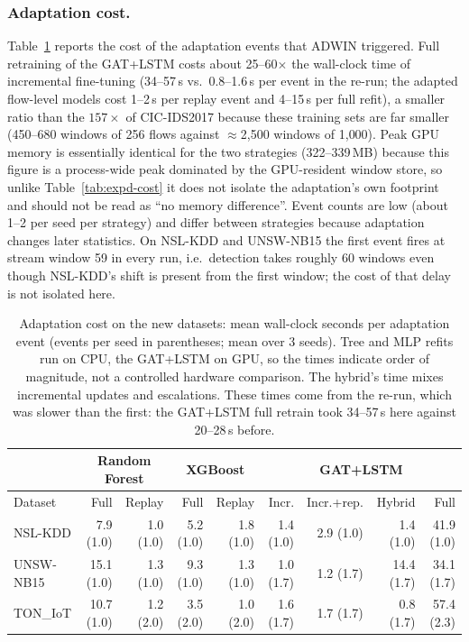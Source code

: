 \documentclass[twocolumn]{llncs}
\begin{document}
\subsubsection{Adaptation cost.} Table~\ref{tab:multi-cost} reports the cost of the adaptation events
that ADWIN triggered. Full retraining of the GAT+LSTM costs about 25--60$\times$ the wall-clock time of incremental
fine-tuning (34--57\,s vs.\ 0.8--1.6\,s per event in the re-run; the adapted flow-level
models cost 1--2\,s per replay event and 4--15\,s per full refit), a smaller ratio than the $157\times$ of
CIC-IDS2017 because these training sets are far smaller (450--680 windows of 256 flows against
$\approx$2{,}500 windows of 1{,}000). Peak GPU memory is essentially identical for the two strategies
(322--339\,MB) because this figure is a process-wide peak dominated by the GPU-resident window store,
so unlike Table~\ref{tab:expd-cost} it does not isolate the adaptation's own footprint and should
not be read as ``no memory difference''. Event counts are low (about 1--2 per seed per strategy) and
differ between strategies because adaptation changes later statistics. On NSL-KDD and UNSW-NB15 the
first event fires at stream window 59 in every run, i.e.\ detection takes roughly 60 windows even
though NSL-KDD's shift is present from the first window; the cost of that delay is not isolated here.

\begin{table}[!t]
\centering
\caption{Adaptation cost on the new datasets: mean wall-clock seconds per adaptation event (events
per seed in parentheses; mean over 3 seeds). Tree and MLP refits run on CPU, the GAT+LSTM on GPU, so
the times indicate order of magnitude, not a controlled hardware comparison. The hybrid's time mixes
incremental updates and escalations. These times come from the re-run, which was slower than the
first: the GAT+LSTM full retrain took 34--57\,s here against 20--28\,s before.}
\label{tab:multi-cost}
\small
\setlength{\tabcolsep}{3pt}
\begin{tabular}{|l|r|r|r|r|r|r|r|r|}
\hline
 & \multicolumn{2}{|c|}{Random Forest} & \multicolumn{2}{|c|}{XGBoost} & \multicolumn{4}{|c|}{GAT+LSTM} \\
\hline
Dataset & Full & Replay & Full & Replay & Incr. & Incr.+rep. & Hybrid & Full \\
\hline
NSL-KDD   & 7.9 (1.0) & 1.0 (1.0) & 5.2 (1.0) & 1.8 (1.0) & 1.4 (1.0) & 2.9 (1.0) & 1.4 (1.0) & 41.9 (1.0) \\
UNSW-NB15 & 15.1 (1.0) & 1.3 (1.0) & 9.3 (1.0) & 1.3 (1.0) & 1.0 (1.7) & 1.2 (1.7) & 14.4 (1.7) & 34.1 (1.7) \\
TON\_IoT  & 10.7 (1.0) & 1.2 (2.0) & 3.5 (2.0) & 1.0 (2.0) & 1.6 (1.7) & 1.7 (1.7) & 0.8 (1.7) & 57.4 (2.3) \\
\hline
\end{tabular}
\end{table}
\end{document}
